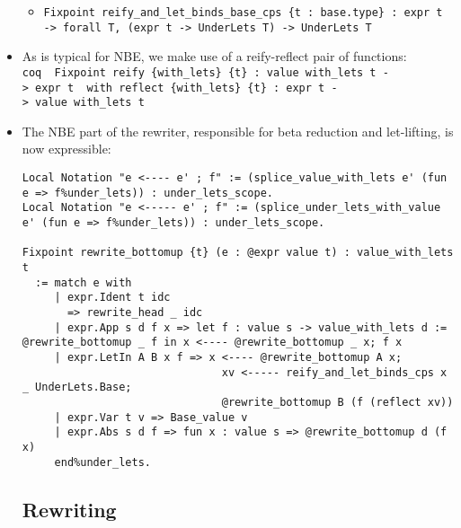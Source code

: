 \begin{itemize}
  \begin{itemize}
  \tightlist
  \item
    \texttt{Fixpoint\ reify\_and\_let\_binds\_base\_cps\ \{t\ :\ base.type\}\ :\ expr\ t\ -\textgreater{}\ forall\ T,\ (expr\ t\ -\textgreater{}\ UnderLets\ T)\ -\textgreater{}\ UnderLets\ T}
  \end{itemize}
\item
  As is typical for NBE, we make use of a reify-reflect pair of
  functions:
  \texttt{coq\ \ Fixpoint\ reify\ \{with\_lets\}\ \{t\}\ :\ value\textquotesingle{}\ with\_lets\ t\ -\textgreater{}\ expr\ t\ \ with\ reflect\ \{with\_lets\}\ \{t\}\ :\ expr\ t\ -\textgreater{}\ value\textquotesingle{}\ with\_lets\ t}
\item
  The NBE part of the rewriter, responsible for beta reduction and
  let-lifting, is now expressible:

\begin{verbatim}
Local Notation "e <---- e' ; f" := (splice_value_with_lets e' (fun e => f%under_lets)) : under_lets_scope.
Local Notation "e <----- e' ; f" := (splice_under_lets_with_value e' (fun e => f%under_lets)) : under_lets_scope.

Fixpoint rewrite_bottomup {t} (e : @expr value t) : value_with_lets t
  := match e with
     | expr.Ident t idc
       => rewrite_head _ idc
     | expr.App s d f x => let f : value s -> value_with_lets d := @rewrite_bottomup _ f in x <---- @rewrite_bottomup _ x; f x
     | expr.LetIn A B x f => x <---- @rewrite_bottomup A x;
                               xv <----- reify_and_let_binds_cps x _ UnderLets.Base;
                               @rewrite_bottomup B (f (reflect xv))
     | expr.Var t v => Base_value v
     | expr.Abs s d f => fun x : value s => @rewrite_bottomup d (f x)
     end%under_lets.
\end{verbatim}

  \subsection{Rewriting}\label{rewriting}


\end{itemize}
